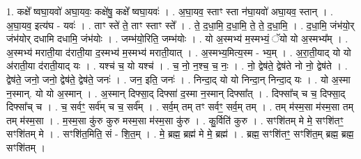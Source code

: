 \documentclass[17pt]{extarticle}
\begin{document}
1. कक्षे᳚ ष्वघा॒यवो॑ अघा॒यवः॒ कक्षे॑षु॒ कक्षे᳚ ष्वघा॒यवः॑ । . अ॒घा॒यव॒ स्ताꣳ स्ता न॑घा॒यवो॑ अघा॒यव॒ स्तान् । . अ॒घा॒यव॒ इत्य॑घ - यवः॑ । . ताꣳ स्ते॑ ते॒ ताꣳ स्ताꣳ स्ते᳚ । . ते॒ द॒धा॒मि॒ द॒धा॒मि॒ ते॒ ते॒ द॒धा॒मि॒ । . द॒धा॒मि॒ जंभ॑यो॒र् जंभ॑योर् दधामि दधामि॒ जंभ॑योः । . जम्भ॑यो॒रिति॒ जम्भ॑योः । . यो अ॒स्मभ्य॑ म॒स्मभ्यं॒ ॅयो यो अ॒स्मभ्य᳚म् । . अ॒स्मभ्य॑ मराती॒या द॑राती॒या द॒स्मभ्य॑ म॒स्मभ्य॑ मराती॒यात् । . अ॒स्मभ्य॒मित्य॒स्म - भ्य॒म् । . अ॒रा॒ती॒याद् यो यो अ॑राती॒या द॑राती॒याद् यः । . यश्च॑ च॒ यो यश्च॑ । . च॒ नो॒ न॒श्च॒ च॒ नः॒ । . नो॒ द्वेष॑ते॒ द्वेष॑ते नो नो॒ द्वेष॑ते । . द्वेष॑ते॒ जनो॒ जनो॒ द्वेष॑ते॒ द्वेष॑ते॒ जनः॑ । . जन॒ इति॒ जनः॑ । . निन्दा॒द् यो यो निन्दा॒न् निन्दा॒द् यः । . यो अ॒स्मा न॒स्मान्. यो यो अ॒स्मान् । . अ॒स्मान् दिफ्सा॒द् दिफ्सा॑ द॒स्मा न॒स्मान् दिफ्सा᳚त् । . दिफ्सा᳚च् च च॒ दिफ्सा॒द् दिफ्सा᳚च् च । . च॒ सर्वꣳ॒॒ सर्व॑म् च च॒ सर्व᳚म् । . सर्व॒म् तम् तꣳ सर्वꣳ॒॒ सर्व॒म् तम् । . तम् म॑स्म॒सा म॑स्म॒सा तम् तम् म॑स्म॒सा । . म॒स्म॒सा कु॑रु कुरु मस्म॒सा म॑स्म॒सा कु॑रु । . कु॒र्विति॑ कुरु । . सꣳशि॑तम् मे मे॒ सꣳशि॑तꣳ॒॒ सꣳशि॑तम् मे । . सꣳशि॑त॒मिति॒ सं - शि॒त॒म् । . मे॒ ब्रह्म॒ ब्रह्म॑ मे मे॒ ब्रह्म॑ । . ब्रह्म॒ सꣳशि॑तꣳ॒॒ सꣳशि॑त॒म् ब्रह्म॒ ब्रह्म॒ सꣳशि॑तम् । \newline
\end{document}
